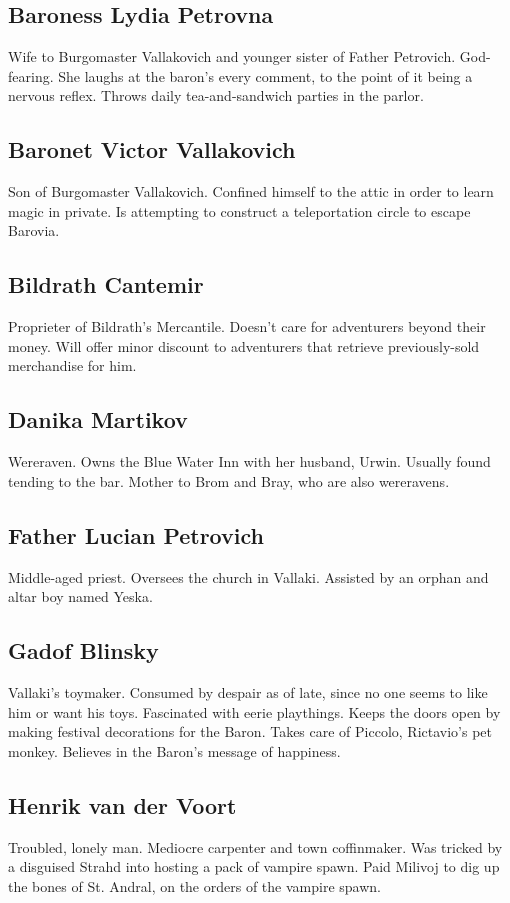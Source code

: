 \documentclass[a4paper,11pt]{article}
\begin{document}
\subsection{Baroness Lydia Petrovna}
  Wife to Burgomaster Vallakovich and younger sister of Father Petrovich. God-fearing. She laughs at the baron's 
  every comment, to the point of it being a nervous reflex. Throws daily tea-and-sandwich parties in the parlor.
\subsection{Baronet Victor Vallakovich}
  Son of Burgomaster Vallakovich. Confined himself to the attic in order to learn magic in private. Is attempting
  to construct a teleportation circle to escape Barovia.
\subsection{Bildrath Cantemir}
  Proprieter of Bildrath's Mercantile. Doesn't care for adventurers beyond their money. Will offer minor discount
  to adventurers that retrieve previously-sold merchandise for him.
\subsection{Danika Martikov}
  Wereraven. Owns the Blue Water Inn with her husband, Urwin. Usually found tending to the bar. Mother to Brom
  and Bray, who are also wereravens.
\subsection{Father Lucian Petrovich}
  Middle-aged priest. Oversees the church in Vallaki. Assisted by an orphan and altar boy named Yeska.
\subsection{Gadof Blinsky}
  Vallaki's toymaker. Consumed by despair as of late, since no one seems to like him or want his toys. Fascinated
  with eerie playthings. Keeps the doors open by making festival decorations for the Baron. Takes care of 
  Piccolo, Rictavio's pet monkey. Believes in the Baron's message of happiness.
\subsection{Henrik van der Voort}
  Troubled, lonely man. Mediocre carpenter and town coffinmaker. Was tricked by a disguised Strahd into hosting a
  pack of vampire spawn. Paid Milivoj to dig up the bones of St. Andral, on the orders of the vampire spawn.
\end{document}
